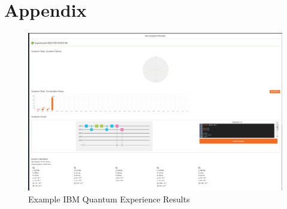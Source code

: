 \documentclass[a4paper]{article}
\begin{document}



\newpage
\section{Appendix} %

\begin{figure}[H] %
\begin{center}
	\includegraphics[scale=0.34]{ScreencapIBMQE_Superdense} %
\end{center}
\caption{Example IBM Quantum Experience Results}\label{IBMQE:ExampleResuts}
\end{figure}


\newpage
%
\end{document}
